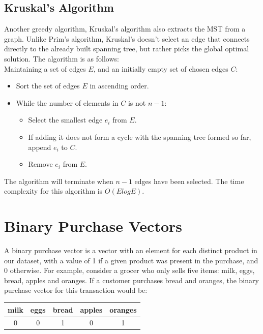 \documentclass[paper=a4,fontsize=11pt]{report}	%
\begin{document}
\subsection{Kruskal's Algorithm}
Another greedy algorithm,  Kruskal's algorithm \cite{kruskal} also extracts the MST from a graph.  Unlike Prim's algorithm, Kruskal's doesn't select an edge that connects directly to the already built spanning tree, but rather picks the global optimal solution. The algorithm is as follows:\\
Maintaining a set of edges $E$, and an initially empty set of chosen edges $C$:
\begin{itemize}
\item Sort the set of edges $E$ in ascending order.
\item While the number of elements in $C$ is not $n-1$:
	\begin{itemize}
	\item Select the smallest edge $e_i$ from $E$.
	\item If adding it does not form a cycle with the spanning tree formed so far, append $e_i$ to $C$.
	\item Remove $e_i$ from $E$.
	\end{itemize}
\end{itemize}
The algorithm will terminate when $n-1$ edges have been selected.  The time complexity for this algorithm is $O(ElogE)$.

\section{Binary Purchase Vectors}
\label{sec:binary_purchase_vectors}
A binary purchase vector is a vector with an element for each distinct product in our dataset, with a value of 1 if a given product was present in the purchase, and 0 otherwise. For example, consider a grocer who only sells five items: milk, eggs, bread, apples and oranges. If a customer purchases bread and oranges, the binary purchase vector for this transaction would be:
\begin{table}[H]
\centering
\begin{tabular}{@{}ccccc@{}}
\toprule
milk & eggs & bread & apples & oranges \\ \midrule
0    & 0    & 1     & 0      & 1       \\ \bottomrule
\end{tabular}
\end{table}
\end{document}

